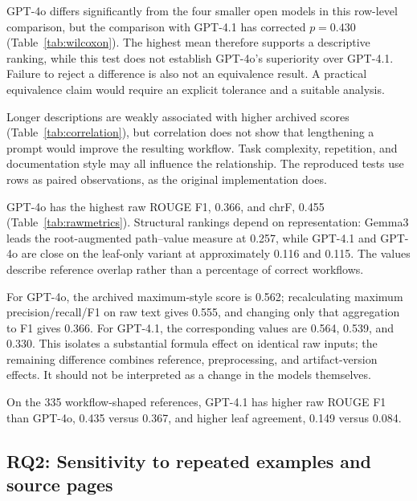 

GPT-4o differs significantly from the four smaller open models in this row-level comparison, but the comparison with GPT-4.1 has corrected $p=0.430$ (Table~\ref{tab:wilcoxon}). The highest mean therefore supports a descriptive ranking, while this test does not establish GPT-4o's superiority over GPT-4.1. Failure to reject a difference is also not an equivalence result. A practical equivalence claim would require an explicit tolerance and a suitable analysis.



\begin{samepage}
Longer descriptions are weakly associated with higher archived scores (Table~\ref{tab:correlation}), but correlation does not show that lengthening a prompt would improve the resulting workflow. Task complexity, repetition, and documentation style may all influence the relationship. The reproduced tests use rows as paired observations, as the original implementation does.
\par\end{samepage}



GPT-4o has the highest raw ROUGE F1, 0.366, and chrF, 0.455 (Table~\ref{tab:rawmetrics}). Structural rankings depend on representation: Gemma3 leads the root-augmented path--value measure at 0.257, while GPT-4.1 and GPT-4o are close on the leaf-only variant at approximately 0.116 and 0.115. The values describe reference overlap rather than a percentage of correct workflows.

For GPT-4o, the archived maximum-style score is 0.562; recalculating maximum precision/recall/F1 on raw text gives 0.555, and changing only that aggregation to F1 gives 0.366. For GPT-4.1, the corresponding values are 0.564, 0.539, and 0.330. This isolates a substantial formula effect on identical raw inputs; the remaining difference combines reference, preprocessing, and artifact-version effects. It should not be interpreted as a change in the models themselves.

On the 335 workflow-shaped references, GPT-4.1 has higher raw ROUGE F1 than GPT-4o, 0.435 versus 0.367, and higher leaf agreement, 0.149 versus 0.084.

\subsection{RQ2: Sensitivity to repeated examples and source pages}



